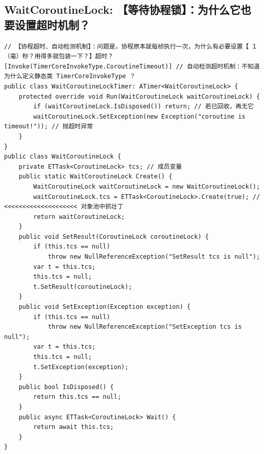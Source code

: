 \documentclass[9pt, b5paper]{article}
\begin{document}
\subsection{WaitCoroutineLock: 【等待协程锁】：为什么它也要设置超时机制？}
\label{sec-14-3}
\begin{verbatim}
// 【协程超时、自动检测机制】：问题是，协程原本就每桢执行一次，为什么有必要设置【 1 （毫）秒？用得多就包装一下？】超时？
[Invoke(TimerCoreInvokeType.CoroutineTimeout)] // 自动检测超时机制：不知道为什么定义静态类 TimerCoreInvokeType ？
public class WaitCoroutineLockTimer: ATimer<WaitCoroutineLock> {
    protected override void Run(WaitCoroutineLock waitCoroutineLock) {
        if (waitCoroutineLock.IsDisposed()) return; // 若已回收，再无它
        waitCoroutineLock.SetException(new Exception("coroutine is timeout!")); // 抛超时异常
    }
}
public class WaitCoroutineLock {
    private ETTask<CoroutineLock> tcs; // 成员变量 
    public static WaitCoroutineLock Create() {
        WaitCoroutineLock waitCoroutineLock = new WaitCoroutineLock();
        waitCoroutineLock.tcs = ETTask<CoroutineLock>.Create(true); // <<<<<<<<<<<<<<<<<<<< 对象池中抓壮丁
        return waitCoroutineLock;
    }
    public void SetResult(CoroutineLock coroutineLock) {
        if (this.tcs == null) 
            throw new NullReferenceException("SetResult tcs is null");
        var t = this.tcs;
        this.tcs = null;
        t.SetResult(coroutineLock);
    }
    public void SetException(Exception exception) {
        if (this.tcs == null) 
            throw new NullReferenceException("SetException tcs is null");
        var t = this.tcs;
        this.tcs = null;
        t.SetException(exception);
    }
    public bool IsDisposed() {
        return this.tcs == null;
    }
    public async ETTask<CoroutineLock> Wait() {
        return await this.tcs;
    }
}
\end{verbatim}
\end{document}
